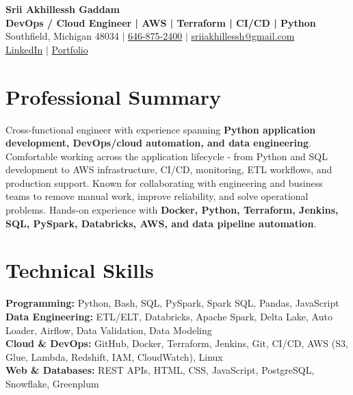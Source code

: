 \documentclass[letterpaper,10pt]{article}
\begin{document}
\fontsize{9.35pt}{10.45pt}\selectfont

\begin{center}
    {\LARGE \textbf{Srii Akhillessh Gaddam}} \\[-1pt]
    \textbf{DevOps / Cloud Engineer | AWS | Terraform | CI/CD | Python} \\[2pt]
    Southfield, Michigan 48034 $|$
    \href{tel:6468752400}{646-875-2400} $|$
    \href{mailto:sriiakhillessh@gmail.com}{sriiakhillessh@gmail.com} \\[1pt]
    \href{https://www.linkedin.com/in/srii-akhiilessh-gaddam-b48668191/}{LinkedIn} $|$
    \href{https://sriiakhillesshg.github.io/portfolio/}{Portfolio}
\end{center}
\vspace{-8pt}

\section{Professional Summary}
\small{Cross-functional engineer with experience spanning \textbf{Python application development, DevOps/cloud automation, and data engineering}. Comfortable working across the application lifecycle - from Python and SQL development to AWS infrastructure, CI/CD, monitoring, ETL workflows, and production support. Known for collaborating with engineering and business teams to remove manual work, improve reliability, and solve operational problems. Hands-on experience with \textbf{Docker, Python, Terraform, Jenkins, SQL, PySpark, Databricks, AWS, and data pipeline automation}.}

\section{Technical Skills}
\small{
\textbf{Programming:} Python, Bash, SQL, PySpark, Spark SQL, Pandas, JavaScript \\
\textbf{Data Engineering:} ETL/ELT, Databricks, Apache Spark, Delta Lake, Auto Loader, Airflow, Data Validation, Data Modeling \\
\textbf{Cloud \& DevOps:} GitHub, Docker, Terraform, Jenkins, Git, CI/CD, AWS (S3, Glue, Lambda, Redshift, IAM, CloudWatch), Linux \\
\textbf{Web \& Databases:} REST APIs, HTML, CSS, JavaScript, PostgreSQL, Snowflake, Greenplum
}
\end{document}
